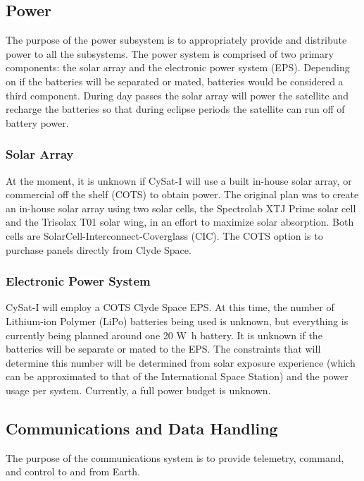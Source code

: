 \documentclass[12pt]{article}
\begin{document}
\subsection{Power}

The purpose of the power subsystem is to appropriately provide and distribute power to all the subsystems. The power system is comprised of two primary components: the solar array and the electronic power system (EPS). Depending on if the batteries will be separated or mated, batteries would be considered a third component. During day passes the solar array will power the satellite and recharge the batteries so that during eclipse periods the satellite can run off of battery power.

\subsubsection{Solar Array}

At the moment, it is unknown if CySat-I will use a built in-house solar array, or commercial off the shelf (COTS) to obtain power. The original plan was to create an in-house solar array using two solar cells, the Spectrolab XTJ Prime solar cell and the Trisolax T01 solar wing, in an effort to maximize solar absorption. Both cells are SolarCell-Interconnect-Coverglass (CIC). The COTS option is to purchase panels directly from Clyde Space.

\subsubsection{Electronic Power System}

CySat-I will employ a COTS Clyde Space EPS. At this time, the number of Lithium-ion Polymer (LiPo) batteries being used is unknown, but everything is currently being planned around one 20 \si{\W\hour} battery. It is unknown if the batteries will be separate or mated to the EPS. The constraints that will determine this number will be determined from solar exposure experience (which can be approximated to that of the International Space Station) and the power usage per system. Currently, a full power budget is unknown.

\subsection{Communications and Data Handling}

The purpose of the communications system is to provide telemetry, command, and control to and from Earth. 
\end{document}
